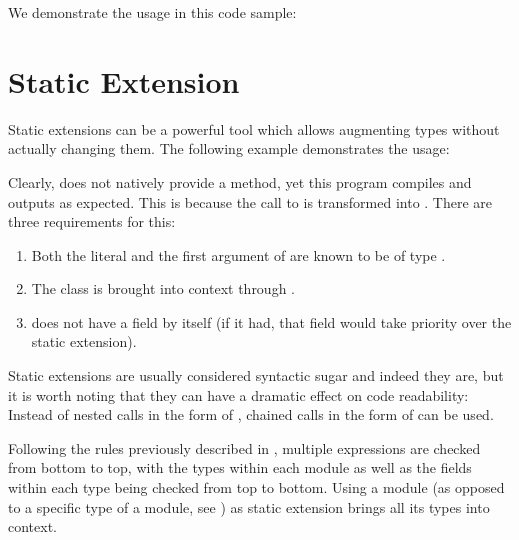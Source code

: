 We demonstrate the usage in this code sample:



\section{Static Extension}
\label{lf-static-extension}


Static extensions can be a powerful tool which allows augmenting types without actually changing them. The following example demonstrates the usage:


Clearly,  does not natively provide a  method, yet this program compiles and outputs  as expected. This is because the call to  is transformed into . There are three requirements for this:

\begin{enumerate}
	\item Both the literal  and the first argument of  are known to be of type .
	\item The class  is brought into context through .
	\item {} does not have a  field by itself (if it had, that field would take priority over the static extension).
\end{enumerate}

Static extensions are usually considered syntactic sugar and indeed they are, but it is worth noting that they can have a dramatic effect on code readability: Instead of nested calls in the form of , chained calls in the form of  can be used.

Following the rules previously described in , multiple  expressions are checked from bottom to top, with the types within each module as well as the fields within each type being checked from top to bottom. Using a module (as opposed to a specific type of a module, see ) as static extension brings all its types into context.

